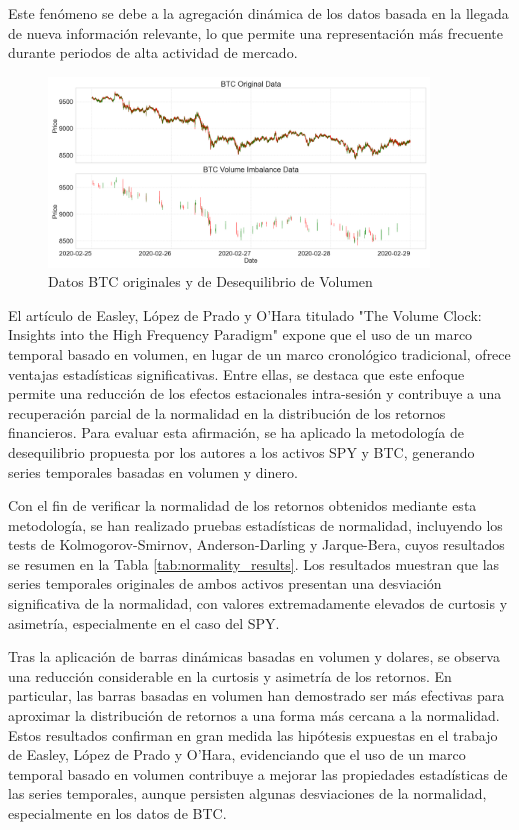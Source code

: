 \documentclass[a4paper,12pt, twoside]{report}
\begin{document}
Este fenómeno se debe a la agregación dinámica de los datos basada en la llegada de nueva información relevante, lo que permite una representación más frecuente
durante periodos de alta actividad de mercado.

\begin{figure}[H]
    \centering
    \includegraphics[width=0.9\textwidth]{./figures/btc_original_volume_imabalance_comp.png}
    \caption{Datos BTC originales y de Desequilibrio de Volumen}
    \label{fig:btc-vol-imb-comp}
\end{figure}

El artículo de Easley, López de Prado y O'Hara titulado "The Volume Clock: Insights into the High Frequency 
Paradigm" \cite{easley2012volume} expone que el uso de un marco temporal basado en volumen, en lugar de un 
marco cronológico tradicional, ofrece ventajas estadísticas significativas. Entre ellas, se destaca que 
este enfoque permite una reducción de los efectos estacionales intra-sesión y contribuye a una recuperación 
parcial de la normalidad en la distribución de los retornos financieros. Para evaluar esta afirmación, se 
ha aplicado la metodología de desequilibrio propuesta por los autores a los activos SPY y BTC, generando 
series temporales basadas en volumen y dinero.

Con el fin de verificar la normalidad de los retornos obtenidos mediante esta metodología, se han realizado 
pruebas estadísticas de normalidad, incluyendo los tests de Kolmogorov-Smirnov, Anderson-Darling y Jarque-Bera, 
cuyos resultados se resumen en la Tabla \ref{tab:normality_results}. Los resultados muestran que las series 
temporales originales de ambos activos presentan una desviación significativa de la normalidad, con valores 
extremadamente elevados de curtosis y asimetría, especialmente en el caso del SPY. 

Tras la aplicación de barras dinámicas basadas en volumen y dolares, se observa una reducción considerable 
en la curtosis y asimetría de los retornos. En particular, las barras basadas en volumen han demostrado 
ser más efectivas para aproximar la distribución de retornos a una forma más cercana a la normalidad. 
Estos resultados confirman en gran medida las hipótesis expuestas en el trabajo de Easley, López de Prado y O'Hara, 
evidenciando que el uso de un marco temporal basado en volumen contribuye a mejorar las propiedades 
estadísticas de las series temporales, aunque persisten algunas desviaciones de la normalidad, 
especialmente en los datos de BTC.
\end{document}
